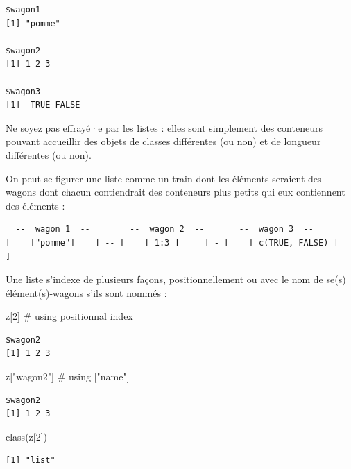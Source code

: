 \documentclass[
  letterpaper,
  DIV=11,
  numbers=noendperiod]{scrreprt}
\newenvironment{Shaded}{\begin{snugshade}}{\end{snugshade}}
\newcommand{\CommentTok}[1]{\textcolor[rgb]{0.37,0.37,0.37}{#1}}
\newcommand{\DecValTok}[1]{\textcolor[rgb]{0.68,0.00,0.00}{#1}}
\newcommand{\FunctionTok}[1]{\textcolor[rgb]{0.28,0.35,0.67}{#1}}
\newcommand{\NormalTok}[1]{\textcolor[rgb]{0.00,0.23,0.31}{#1}}
\newcommand{\StringTok}[1]{\textcolor[rgb]{0.13,0.47,0.30}{#1}}
\begin{document}
\begin{verbatim}
$wagon1
[1] "pomme"

$wagon2
[1] 1 2 3

$wagon3
[1]  TRUE FALSE
\end{verbatim}

Ne soyez pas effrayé·e par les listes : elles sont simplement des
conteneurs pouvant accueillir des objets de classes différentes (ou non)
et de longueur différentes (ou non).

On peut se figurer une liste comme un train dont les éléments seraient
des wagons dont chacun contiendrait des conteneurs plus petits qui eux
contiennent des éléments :

\begin{verbatim}
  --  wagon 1  --        --  wagon 2  --       --  wagon 3  --
[    ["pomme"]    ] -- [    [ 1:3 ]     ] - [    [ c(TRUE, FALSE) ]    ]
\end{verbatim}

Une liste s'indexe de plusieurs façons, positionnellement ou avec le nom
de se(s) élément(s)-wagons s'ils sont nommés :

\begin{Shaded}
\begin{Highlighting}[]
\NormalTok{z[}\DecValTok{2}\NormalTok{]        }\CommentTok{\# using positionnal index}
\end{Highlighting}
\end{Shaded}

\begin{verbatim}
$wagon2
[1] 1 2 3
\end{verbatim}

\begin{Shaded}
\begin{Highlighting}[]
\NormalTok{z[}\StringTok{"wagon2"}\NormalTok{] }\CommentTok{\# using ["name"]}
\end{Highlighting}
\end{Shaded}

\begin{verbatim}
$wagon2
[1] 1 2 3
\end{verbatim}

\begin{Shaded}
\begin{Highlighting}[]
\FunctionTok{class}\NormalTok{(z[}\DecValTok{2}\NormalTok{])}
\end{Highlighting}
\end{Shaded}

\begin{verbatim}
[1] "list"
\end{verbatim}
\end{document}
